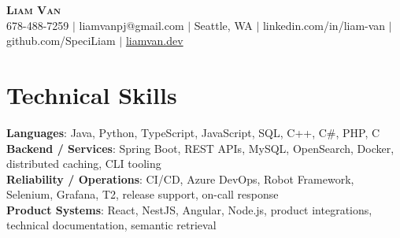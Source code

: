 \documentclass[letterpaper,11pt]{article}
\begin{document}

%
\begin{center}
    \textbf{\Huge \scshape Liam Van} \\ \vspace{1pt}
    \small 678-488-7259 $|$ \small {liamvanpj@gmail.com} $|$ Seattle, WA
 {{$|$ linkedin.com/in/liam-van} {$|$ github.com/SpeciLiam} {$|$ \href{https://liamvan.dev}{liamvan.dev}}}

\end{center}

\section{Technical Skills}
 \begin{itemize}[leftmargin=0.15in, label={}]
    \small{\item{
     \textbf{Languages}{: Java, Python, TypeScript, JavaScript, SQL, C++, C\#, PHP, C} \\
     \textbf{Backend / Services}{: Spring Boot, REST APIs, MySQL, OpenSearch, Docker, distributed caching, CLI tooling} \\
     \textbf{Reliability / Operations}{: CI/CD, Azure DevOps, Robot Framework, Selenium, Grafana, T2, release support, on-call response} \\
     \textbf{Product Systems}{: React, NestJS, Angular, Node.js, product integrations, technical documentation, semantic retrieval} \\
    }}
 \end{itemize}
%
\end{document}
